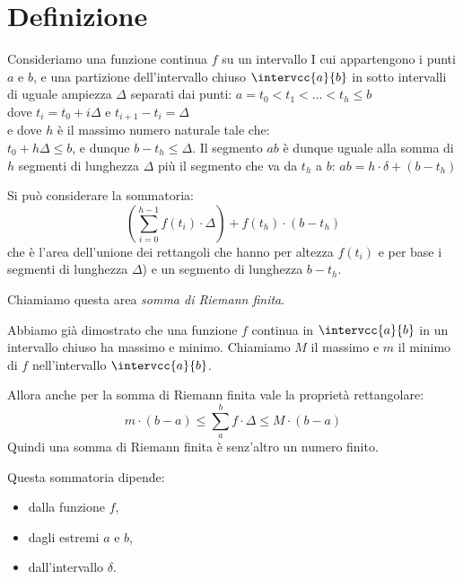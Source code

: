 \section{Definizione}
\label{sec:integrali_definizione}

\begin{minipage}{.49\textwidth} 
Consideriamo una funzione continua \(f\) su un intervallo I cui 
appartengono i punti \(a\) e \(b\), e una partizione dell'intervallo chiuso 
\(\intervcc{a}{b}\) in sotto intervalli di uguale ampiezza \(\Delta\) 
separati dai punti: 
\(a = t_0 < t_1 < \dots < t_h \le b\) \\
dove \(t_i = t_0 +i \Delta\) \quad e \quad \(t_{i+1} - t_i= \Delta\) \\
e dove \(h\) è il massimo numero naturale tale che: \\
\(t_0 + h \Delta \le b\), e dunque \(b-t_h \le \Delta\). 
Il segmento \(ab\) è dunque uguale alla somma di \(h\) segmenti di lunghezza 
\(\Delta\) più il segmento che va da \(t_h\) a \(b\):
\(ab = h \cdot \delta + (b - t_h)\)
\end{minipage}
\hfill
\begin{minipage}{.49\textwidth}
\begin{inaccessibleblock} 
  \sommariemann
\end{inaccessibleblock}
\end{minipage}

Si può considerare la sommatoria:
\[\left(\sum_{i=0}^{h-1} f(t_i)\cdot\Delta \right)+f(t_h)\cdot(b-t_h)\] 
che è l'area dell'unione dei rettangoli che 
hanno per altezza \(f(t_i)\) 
e per base i segmenti di lunghezza \(\Delta\)) e un segmento di lunghezza \(b 
- t_{h}\). 

Chiamiamo questa area \emph{somma di Riemann finita}.

Abbiamo già dimostrato che una funzione \(f\) continua in 
\(\intervcc{a}{b}\) in un intervallo chiuso ha massimo e minimo. 
Chiamiamo \(M\) il massimo e \(m\) il minimo di \(f\) nell'intervallo 
\(\intervcc{a}{b}\).

Allora anche per la somma di Riemann finita vale la proprietà rettangolare: 
\[m\cdot(b - a) \le \sum_a^b f \cdot\Delta \le M\cdot(b - a)\] 
Quindi una somma di Riemann finita è senz'altro un numero finito.

Questa sommatoria dipende:
\begin{itemize} [nosep]
 \item dalla funzione \(f\),
 \item dagli estremi \(a\) e \(b\),
 \item dall'intervallo \(\delta\).
\end{itemize}

